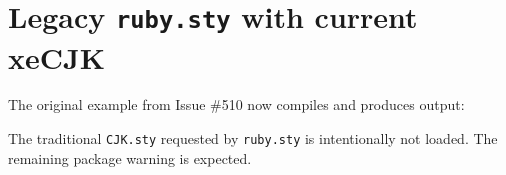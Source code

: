 \documentclass{article}
\begin{document}
\section*{Legacy \texttt{ruby.sty} with current xeCJK}

The original example from Issue \#510 now compiles and produces output:

\begin{center}
\end{center}

The traditional \texttt{CJK.sty} requested by \texttt{ruby.sty} is
intentionally not loaded.  The remaining package warning is expected.
\end{document}
